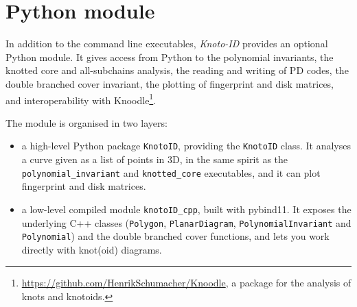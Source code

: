 %
%
%
%

\section{\label{sec:python}Python module}
In addition to the command line executables, {\it Knoto-ID} provides an optional Python module. It gives access from Python to the polynomial invariants, the knotted core and all-subchains analysis, the reading and writing of PD codes, the double branched cover invariant, the plotting of fingerprint and disk matrices, and interoperability with Knoodle\footnote{\url{https://github.com/HenrikSchumacher/Knoodle}, a package for the analysis of knots and knotoids.}.

The module is organised in two layers:
\begin{itemize}
\item a high-level Python package \lstinline{KnotoID}, providing the \lstinline{KnotoID} class. It analyses a curve given as a list of points in 3D, in the same spirit as the \lstinline{polynomial_invariant} and \lstinline{knotted_core} executables, and it can plot fingerprint and disk matrices.
\item a low-level compiled module \lstinline{knotoID_cpp}, built with pybind11. It exposes the underlying C++ classes (\lstinline{Polygon}, \lstinline{PlanarDiagram}, \lstinline{PolynomialInvariant} and \lstinline{Polynomial}) and the double branched cover functions, and lets you work directly with knot(oid) diagrams.
\end{itemize}

